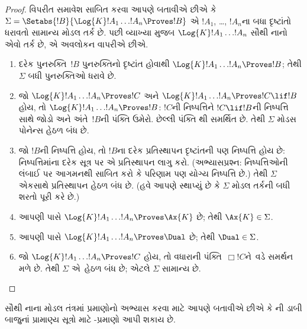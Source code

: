 \begin{proof}
  વિપરીત સમાવેશ સાબિત કરવા આપણે બતાવીએ છીએ કે
  $\Sigma = \Setabs{!B}{\Log{K} !A_1 \dots !A_n \Proves !B }$ એ
  $!A_1$, \dots, $!A_n$ના બધા દૃષ્ટાંતો ધરાવતો સામાન્ય મોડલ તર્ક છે.
  પછી વ્યાખ્યા મુજબ $\Log{K} !A_1 \dots !A_n$ સૌથી નાનો એવો તર્ક
  છે, એ અવલોકન વાપરીએ છીએ.
  \begin{enumerate}
    \item દરેક પુનરુક્તિ~$!B$ પુનરુક્તિનો દૃષ્ટાંત હોવાથી
      $\Log{K}!A_1\dots!A_n \Proves !B$; તેથી $\Sigma$ બધી
      પુનરુક્તિઓ ધરાવે છે.
    \item જો $\Log{K}!A_1\dots!A_n \Proves !C$ અને
      $\Log{K}!A_1\dots!A_n \Proves !C \lif !B$ હોય, તો
      $\Log{K}!A_1\dots!A_n \Proves !B$: $!C$ની નિષ્પત્તિને
      $!C \lif !B$ની નિષ્પત્તિ સાથે જોડો અને અંતે~$!B$ની પંક્તિ
      ઉમેરો. છેલ્લી પંક્તિ \MP{}થી સમર્થિત છે. તેથી $\Sigma$ મોડસ
      પોનેન્સ હેઠળ બંધ છે.
    \item જો $!B$ની નિષ્પત્તિ હોય, તો $!B$ના દરેક પ્રતિસ્થાપન
      દૃષ્ટાંતની પણ નિષ્પત્તિ હોય છે: નિષ્પત્તિમાંના દરેક
      સૂત્ર પર એ પ્રતિસ્થાપન લાગુ કરો. (અભ્યાસપ્રશ્ન: નિષ્પત્તિઓની
      લંબાઈ પર આગમનથી સાબિત કરો કે પરિણામ પણ યોગ્ય નિષ્પત્તિ છે.)
      તેથી $\Sigma$ એકસાથે પ્રતિસ્થાપન હેઠળ બંધ છે. (હવે આપણે
      સ્થાપ્યું છે કે $\Sigma$ મોડલ તર્કની બધી શરતો પૂરી કરે છે.)
    \item આપણી પાસે $\Log{K}!A_1\dots!A_n \Proves \Ax{K}$ છે;
      તેથી $\Ax{K} \in \Sigma$.
    \item આપણી પાસે
      $\Log{K}!A_1\dots!A_n \Proves \Dual$ છે; તેથી $\Dual \in \Sigma$.
    \item જો $\Log{K}!A_1\dots!A_n \Proves !C$ હોય, તો વધારાની
      પંક્તિ~$\Box !C$ને~\Nec વડે સમર્થન મળે છે. તેથી $\Sigma$
      એ~\Nec હેઠળ બંધ છે; એટલે $\Sigma$ સામાન્ય છે.
  \end{enumerate}
\end{proof}
\endgroup

\begingroup
\makeatletter{}\makeatother


\label{guunit:OLP-0431}


સૌથી નાના મોડલ તંત્રમાં પ્રમાણોનો અભ્યાસ કરવા માટે આપણે બતાવીએ છીએ કે
ની ડાબી બાજુનાં પ્રામાણ્ય
સૂત્રો માટે -પ્રમાણો આપી શકાય છે.

